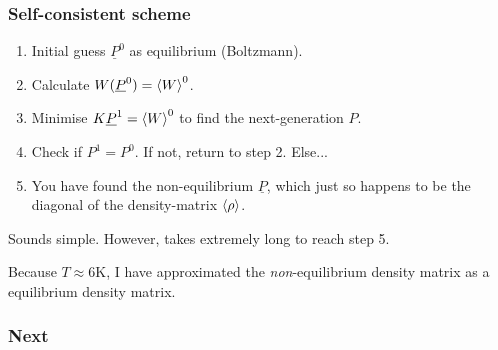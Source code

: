 \begin{frame}
    \frametitle{Self-consistent scheme}
    \begin{enumerate} 
    \item Initial guess $\underline{P}^0$ as equilibrium (Boltzmann).
    \item Calculate $W(\underline{P}^0) = \braket{W}^0$.
    \item Minimise $K \underline{P}^1 = \braket{W}^0$ to find the next-generation $P$.
    \item Check if $P^1 = P^0$. If not, return to step 2. Else...
    \item You have found the non-equilibrium $\underline{P}$, which just so happens to be the diagonal of the density-matrix $\braket{\rho}$.
    \end{enumerate} 
    
    Sounds simple. However, takes extremely long to reach step 5. 
    
    Because $T\approx 6$K, I have approximated the \emph{non}-equilibrium density matrix as a equilibrium density matrix. 
\end{frame}%
\begin{frame}
    \frametitle{Next}
\end{frame}
